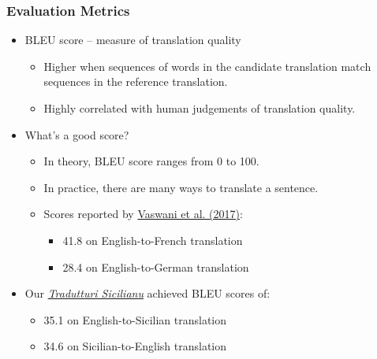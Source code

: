 \documentclass{beamer}
\begin{document}
\begin{frame}
  \frametitle{Evaluation Metrics}
  \vspace{-1.0em}
  \begin{itemize}
  \item BLEU score -- measure of translation quality
    \begin{itemize}
    \item Higher when sequences of words in the candidate translation match sequences in the reference translation.
    \item Highly correlated with human judgements of translation quality.
    \end{itemize} 
    \vspace{0.5em}
  \item What's a good score?
    \begin{itemize}
    \item In theory, BLEU score ranges from 0 to 100.
    \item In practice, there are many ways to translate a sentence.
    \item Scores reported by \href{https://arxiv.org/abs/1706.03762}{Vaswani et al. (2017)}:
      \begin{itemize} 
      \item 41.8 on English-to-French translation
      \item 28.4 on English-to-German translation
      \end{itemize} 
    \end{itemize} 
    \vspace{0.5em}
  \item Our \href{https://translate.napizia.com}{\textit{Tradutturi Sicilianu}} achieved BLEU scores of:
    \begin{itemize}
    \item 35.1 on English-to-Sicilian translation
    \item 34.6 on Sicilian-to-English translation
    \end{itemize} 
  \end{itemize} 
\end{frame}

\end{document}
